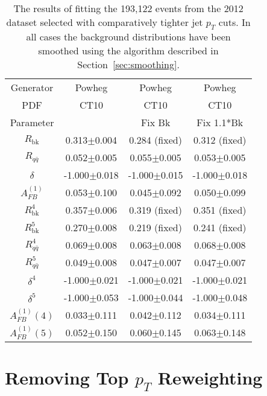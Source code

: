 \documentclass{cmspaperpdf}
\begin{document}
\begin{table}[hbt]
\begin{center}
\caption{\small \label{tab:restricted_eta_space_data} The results of fitting the 193,122 events from the 2012 dataset selected with comparatively tighter jet $p_{T}$ cuts. In all cases the background distributions have been smoothed using the algorithm described in Section~\ref{sec:smoothing}.}
\vspace{3pt}
\begin{tabular}{|c|c|c|c|}\hline
Generator          & Powheg           & Powheg           & Powheg            \\
   PDF             & CT10             & CT10             & CT10              \\
Parameter          &                  & Fix Bk           & Fix 1.1*Bk        \\
\hline
$R_\mathrm{bk}$    & 0.313$\pm$0.004  & 0.284 (fixed)    & 0.312 (fixed)     \\
$R_{q\bar q}$      & 0.052$\pm$0.005  & 0.055$\pm$0.005  & 0.053$\pm$0.005   \\
$\delta$           & -1.000$\pm$0.018 & -1.000$\pm$0.015 & -1.000$\pm$0.018  \\
$A^{(1)}_{FB}$     & 0.053$\pm$0.100  & 0.045$\pm$0.092  & 0.050$\pm$0.099   \\
\hline
$R^4_\mathrm{bk}$  & 0.357$\pm$0.006  & 0.319 (fixed)    & 0.351 (fixed)     \\
$R^5_\mathrm{bk}$  & 0.270$\pm$0.008  & 0.219 (fixed)    & 0.241 (fixed)     \\
$R^4_{q\bar q}$    & 0.069$\pm$0.008  & 0.063$\pm$0.008  & 0.068$\pm$0.008   \\
$R^5_{q\bar q}$    & 0.049$\pm$0.008  & 0.047$\pm$0.007  & 0.047$\pm$0.007   \\
$\delta^4$         & -1.000$\pm$0.021 & -1.000$\pm$0.021 & -1.000$\pm$0.021  \\
$\delta^5$         & -1.000$\pm$0.053 & -1.000$\pm$0.044 & -1.000$\pm$0.048  \\
$A^{(1)}_{FB}(4)$  & 0.033$\pm$0.111  & 0.042$\pm$0.112  & 0.034$\pm$0.111   \\
$A^{(1)}_{FB}(5)$  & 0.052$\pm$0.150  & 0.060$\pm$0.145  & 0.063$\pm$0.148   \\
\hline
\end{tabular}
\end{center}
\end{table}

\section{Removing Top $p_{T}$ Reweighting}
\end{document}
